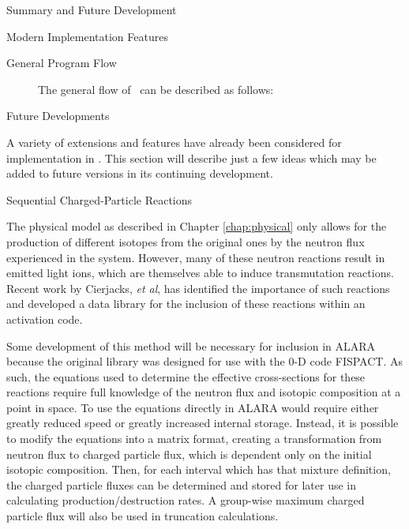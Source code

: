 \begin{chapter}{Summary and Future Development}
\begin{section}{Modern Implementation Features\label{sec:summary.modern}}
    \newpage
    \begin{subsection}{General Program Flow}
      
      \begin{figure}[htbp]
        \caption{The general flow of \ALARA\ can be described as follows:}
        \label{fig:summary.prog_flow}
      \end{figure}
      \begin{center}
      \end{center}
    
    \end{subsection}
    
  \end{section}
  
  \begin{section}{Future Developments}
  
    A variety of extensions and features have already been considered
    for implementation in \ALARA.  This section will describe just a
    few ideas which may be added to future versions in its continuing
    development.

    \begin{subsection}{Sequential Charged-Particle Reactions}\label{ssec:future.data.seq}
    
      The physical model as described in Chapter \ref{chap:physical}
      only allows for the production of different isotopes from the
      original ones by the neutron flux experienced in the system.
      However, many of these neutron reactions result in emitted light
      ions, which are themselves able to induce transmutation
      reactions.  Recent work by Cierjacks, \textsl{et
        al}\cite{sequential}, has identified the importance of such
      reactions and developed a data library for the inclusion of
      these reactions within an activation code.
    
      Some development of this method will be necessary for inclusion
      in ALARA because the original library was designed for use with
      the 0-D code FISPACT.  As such, the equations used to determine
      the effective cross-sections for these reactions require full
      knowledge of the neutron flux and isotopic composition at a
      point in space.  To use the equations directly in ALARA would
      require either greatly reduced speed or greatly increased
      internal storage.  Instead, it is possible to modify the
      equations into a matrix format, creating a transformation from
      neutron flux to charged particle flux, which is dependent only
      on the initial isotopic composition.  Then, for each interval
      which has that mixture definition, the charged particle fluxes
      can be determined and stored for later use in calculating
      production/destruction rates.  A group-wise maximum charged
      particle flux will also be used in truncation calculations.
    

\end{subsection}
\end{section}
\end{chapter}
